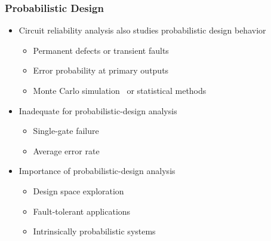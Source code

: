 \begin{frame}
    \frametitle{Probabilistic Design}
    \begin{itemize}
        \item Circuit reliability analysis also studies probabilistic design behavior
              \pause
              \begin{itemize}
                  \item Permanent defects or transient faults
                        \pause
                  \item Error probability at primary outputs
                        \pause
                  \item Monte Carlo simulation~\cite{Mohanram2003} or statistical methods~\cite{Bahar2003,Krishnaswamy2005,Rejimon2005}
                        \pause
              \end{itemize}
        \item Inadequate for probabilistic-design analysis
              \pause
              \begin{itemize}
                  \item Single-gate failure
                        \pause
                  \item Average error rate
                        \pause
              \end{itemize}
        \item Importance of probabilistic-design analysis
              \pause
              \begin{itemize}
                  \item Design space exploration
                        \pause
                  \item Fault-tolerant applications
                        \pause
                  \item Intrinsically probabilistic systems
              \end{itemize}
    \end{itemize}
\end{frame}